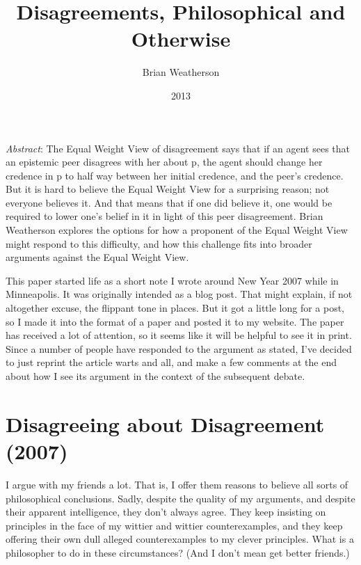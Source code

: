 \documentclass[
  11pt,
  letterpaper,
  DIV=11,
  numbers=noendperiod,
  twoside]{scrartcl}
\title{Disagreements, Philosophical and Otherwise}
\author{Brian Weatherson}
\date{2013}
\renewenvironment{abstract}
 {\vspace{-1.25cm}
 \quotation\small\noindent\emph{Abstract}:}
 {\endquotation}
\renewenvironment{abstract}
 {\quotation\small\noindent\emph{Abstract}:}
 {\endquotation\vspace{-0.02cm}}
\begin{document}
\maketitle
\begin{abstract}
The Equal Weight View of disagreement says that if an agent sees that an
epistemic peer disagrees with her about p, the agent should change her
credence in p to half way between her initial credence, and the peer's
credence. But it is hard to believe the Equal Weight View for a
surprising reason; not everyone believes it. And that means that if one
did believe it, one would be required to lower one's belief in it in
light of this peer disagreement. Brian Weatherson explores the options
for how a proponent of the Equal Weight View might respond to this
difficulty, and how this challenge fits into broader arguments against
the Equal Weight View.
\end{abstract}


This paper started life as a short note I wrote around New Year 2007
while in Minneapolis. It was originally intended as a blog post. That
might explain, if not altogether excuse, the flippant tone in places.
But it got a little long for a post, so I made it into the format of a
paper and posted it to my website. The paper has received a lot of
attention, so it seems like it will be helpful to see it in print. Since
a number of people have responded to the argument as stated, I've
decided to just reprint the article warts and all, and make a few
comments at the end about how I see its argument in the context of the
subsequent debate.

\section*{Disagreeing about Disagreement
(2007)}\label{disagreeing-about-disagreement-2007}

I argue with my friends a lot. That is, I offer them reasons to believe
all sorts of philosophical conclusions. Sadly, despite the quality of my
arguments, and despite their apparent intelligence, they don't always
agree. They keep insisting on principles in the face of my wittier and
wittier counterexamples, and they keep offering their own dull alleged
counterexamples to my clever principles. What is a philosopher to do in
these circumstances? (And I don't mean get better friends.)
\end{document}
